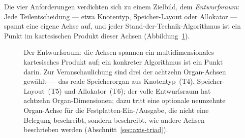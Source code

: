 Die vier Anforderungen verdichten sich zu einem Zielbild, dem \emph{Entwurfsraum}: Jede Teilentscheidung
--- etwa Knotentyp, Speicher-Layout oder Allokator --- spannt eine eigene Achse auf, und jeder
Stand-der-Technik-Algorithmus ist ein Punkt im kartesischen Produkt dieser Achsen
(Abbildung~\ref{fig:design-space}).
\begin{figure}[htbp]\centering
{}
\caption{Der Entwurfsraum: die Achsen spannen ein multidimensionales kartesisches Produkt auf; ein konkreter Algorithmus ist ein Punkt darin. Zur Veranschaulichung sind drei der achtzehn Organ-Achsen gewählt --- das reale Speicherorgan aus Knotentyp~(T4), Speicher-Layout~(T5) und Allokator~(T6); der volle Entwurfsraum hat achtzehn Organ-Dimensionen; dazu tritt eine optionale neunzehnte Organ-Achse für die Festplatten-Ein-/Ausgabe, die nicht eine Belegung beschreibt, sondern beschreibt, wie andere Achsen beschrieben werden (Abschnitt~\ref{sec:axis-triad}).}\label{fig:design-space}
\end{figure}

